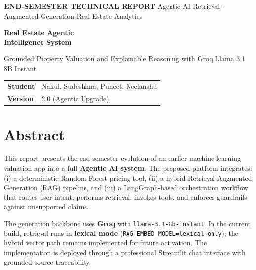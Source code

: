 \documentclass[12pt,a4paper]{article}
\begin{document}
\begin{titlepage}
\color{white}
\pagecolor{PrimaryBlue}
\vspace*{1.8cm}

{\Large\bfseries END-SEMESTER TECHNICAL REPORT}
{\large Agentic AI \;\textbar\; Retrieval-Augmented Generation \;\textbar\; Real Estate Analytics}

\vspace{2.0cm}

{\fontsize{30}{34}\bfseries Real Estate Agentic\\[0.2em]Intelligence System}

\vspace{0.8cm}

{\large Grounded Property Valuation and Explainable Reasoning with Groq Llama 3.1 8B Instant}

\vspace{2.2cm}

\begin{tabular}{@{}ll}
\textbf{Student} & Nakul, Sudeshhna, Puneet, Neelanshu \\
\textbf{Version} & 2.0 (Agentic Upgrade) \\
\end{tabular}

\vfill
\end{titlepage}

\pagecolor{white}
\color{DarkGray}

\tableofcontents
\newpage

\section{Abstract}
This report presents the end-semester evolution of an earlier machine learning valuation app into a full \textbf{Agentic AI system}. The proposed platform integrates: (i) a deterministic Random Forest pricing tool, (ii) a hybrid Retrieval-Augmented Generation (RAG) pipeline, and (iii) a LangGraph-based orchestration workflow that routes user intent, performs retrieval, invokes tools, and enforces guardrails against unsupported claims.

The generation backbone uses \textbf{Groq} with \texttt{llama-3.1-8b-instant}. In the current build, retrieval runs in \textbf{lexical mode} (\texttt{RAG\_EMBED\_MODEL=lexical-only}); the hybrid vector path remains implemented for future activation. The implementation is deployed through a professional Streamlit chat interface with grounded source traceability.
\end{document}
